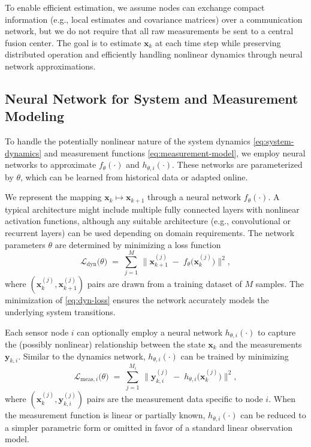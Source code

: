 \documentclass[letterpaper, 10 pt, conference]{ieeeconf}
\begin{document}
To enable efficient estimation, we assume nodes can exchange compact information (e.g., local estimates and covariance matrices) over a communication network, but we do not require that all raw measurements be sent to a central fusion center. The goal is to estimate $\mathbf{x}_k$ at each time step while preserving distributed operation and efficiently handling nonlinear dynamics through neural network approximations.

\subsection{Neural Network for System and Measurement Modeling}
\label{sec:nn-modeling}

To handle the potentially nonlinear nature of the system dynamics \eqref{eq:system-dynamics} and measurement functions \eqref{eq:measurement-model}, we employ neural networks to approximate $f_{\theta}(\cdot)$ and $h_{\theta,i}(\cdot)$. These networks are parameterized by $\theta$, which can be learned from historical data or adapted online.

We represent the mapping $\mathbf{x}_k \mapsto \mathbf{x}_{k+1}$ through a neural network $f_{\theta}(\cdot)$. A typical architecture might include multiple fully connected layers with nonlinear activation functions, although any suitable architecture (e.g., convolutional or recurrent layers) can be used depending on domain requirements. The network parameters $\theta$ are determined by minimizing a loss function
\begin{equation}
    \mathcal{L}_{\mathrm{dyn}}\bigl(\theta\bigr) \;=\; \sum_{j=1}^{M}\,
    \bigl\|\mathbf{x}_{k+1}^{(j)} \;-\; f_{\theta}\bigl(\mathbf{x}_k^{(j)}\bigr)\bigr\|^2,
    \label{eq:dyn-loss}
\end{equation}
where $(\mathbf{x}_k^{(j)}, \mathbf{x}_{k+1}^{(j)})$ pairs are drawn from a training dataset of $M$ samples. The minimization of \eqref{eq:dyn-loss} ensures the network accurately models the underlying system transitions.

Each sensor node $i$ can optionally employ a neural network $h_{\theta,i}(\cdot)$ to capture the (possibly nonlinear) relationship between the state $\mathbf{x}_k$ and the measurements $\mathbf{y}_{k,i}$. Similar to the dynamics network, $h_{\theta,i}(\cdot)$ can be trained by minimizing
\begin{equation}
    \mathcal{L}_{\mathrm{meas},i}\bigl(\theta\bigr) \;=\; \sum_{j=1}^{M_i}\,
    \bigl\|\mathbf{y}_{k,i}^{(j)} \;-\; h_{\theta,i}\bigl(\mathbf{x}_k^{(j)}\bigr)\bigr\|^2,
    \label{eq:meas-loss}
\end{equation}
where $(\mathbf{x}_k^{(j)}, \mathbf{y}_{k,i}^{(j)})$ pairs are the measurement data specific to node $i$. When the measurement function is linear or partially known, $h_{\theta,i}(\cdot)$ can be reduced to a simpler parametric form or omitted in favor of a standard linear observation model.
\end{document}
